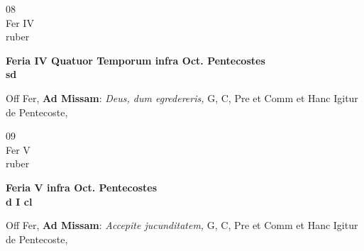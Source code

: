 \documentclass[10pt, openany]{book}
\begin{document}
        \begin{center}
            \begin{minipage}{3.5in}
                \vspace{2em}
                \begin{minipage}{0.5in}
                    {\Huge 08} \\
                    {\normalsize Fer IV} \\
                    {\normalsize ruber}
                \end{minipage}
                \begin{minipage}{3.0in}
                    \textbf{ \large Feria IV Quatuor Temporum infra Oct. Pentecostes \\
                    \textnormal{\normalsize sd}} \\ 
                \end{minipage}
                \begin{justify}Off Fer, \textbf{Ad Missam}: \textit{Deus, dum egredereris,} G, C, Pre et Comm et Hanc Igitur de Pentecoste,   
                \end{justify}
            \end{minipage}
        \end{center}
    
        \begin{center}
            \begin{minipage}{3.5in}
                \vspace{2em}
                \begin{minipage}{0.5in}
                    {\Huge 09} \\
                    {\normalsize Fer V} \\
                    {\normalsize ruber}
                \end{minipage}
                \begin{minipage}{3.0in}
                    \textbf{ \large Feria V infra Oct. Pentecostes \\
                    \textnormal{\normalsize d I cl}} \\ 
                \end{minipage}
                \begin{justify}Off Fer, \textbf{Ad Missam}: \textit{Accepite jucunditatem,} G, C, Pre et Comm et Hanc Igitur de Pentecoste,   
                \end{justify}
            \end{minipage}
        \end{center}
    
\end{document}

